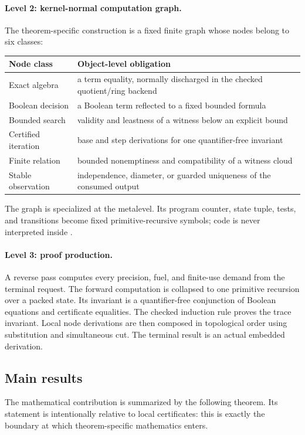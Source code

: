 \paragraph{Level 2: kernel-normal computation graph.}
The theorem-specific construction is a fixed finite graph whose nodes belong to six classes:
\begin{center}
\begin{tabular}{@{}ll@{}}
\toprule
Node class & Object-level obligation \\
\midrule
Exact algebra & a term equality, normally discharged in the checked quotient/ring backend \\
Boolean decision & a Boolean term reflected to a fixed bounded formula \\
Bounded search & validity and leastness of a witness below an explicit bound \\
Certified iteration & base and step derivations for one quantifier-free invariant \\
Finite relation & bounded nonemptiness and compatibility of a witness cloud \\
Stable observation & independence, diameter, or guarded uniqueness of the consumed output \\
\bottomrule
\end{tabular}
\end{center}
The graph is specialized at the metalevel.  Its program counter, state tuple, tests, and transitions become fixed primitive-recursive symbols; code is never interpreted inside \iPRA.

\paragraph{Level 3: proof production.}
A reverse pass computes every precision, fuel, and finite-use demand from the terminal request.  The forward computation is collapsed to one primitive recursion over a packed state.  Its invariant is a quantifier-free conjunction of Boolean equations and certificate equalities.  The checked induction rule proves the trace invariant.  Local node derivations are then composed in topological order using substitution and simultaneous cut.  The terminal result is an actual embedded derivation.

\subsection{Main results}

The mathematical contribution is summarized by the following theorem.  Its statement is intentionally relative to local certificates: this is exactly the boundary at which theorem-specific mathematics enters.

